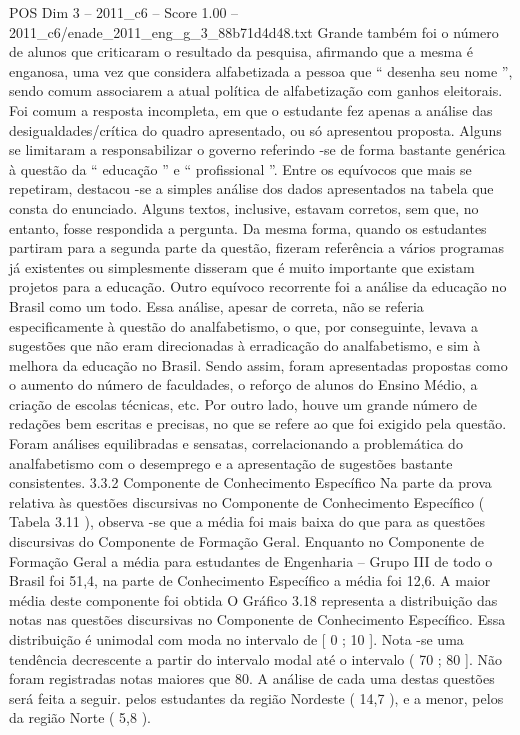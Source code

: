 \begin{textsample}{POS Dim 3 – 2011\_c6 – Score 1.00 – 2011\_c6/enade\_2011\_eng\_g\_3\_88b71d4d48.txt}
Grande também foi o número de alunos que criticaram o resultado da pesquisa, afirmando que a mesma é enganosa, uma vez que considera alfabetizada a pessoa que “ desenha seu nome ”, sendo comum associarem a atual política de alfabetização com ganhos eleitorais.
Foi comum a resposta incompleta, em que o estudante fez apenas a análise das desigualdades/crítica do quadro apresentado, ou só apresentou proposta.
Alguns se limitaram a responsabilizar o governo referindo -se de forma bastante genérica à questão da “ educação ” e “ profissional ”.
Entre os equívocos que mais se repetiram, destacou -se a simples análise dos dados apresentados na tabela que consta do enunciado.
Alguns textos, inclusive, estavam corretos, sem que, no entanto, fosse respondida a pergunta.
Da mesma forma, quando os estudantes partiram para a segunda parte da questão, fizeram referência a vários programas já existentes ou simplesmente disseram que é muito importante que existam projetos para a educação.
Outro equívoco recorrente foi a análise da educação no Brasil como um todo.
Essa análise, apesar de correta, não se referia especificamente à questão do analfabetismo, o que, por conseguinte, levava a sugestões que não eram direcionadas à erradicação do analfabetismo, e sim à melhora da educação no Brasil.
Sendo assim, foram apresentadas propostas como o aumento do número de faculdades, o reforço de alunos do Ensino Médio, a criação de escolas técnicas, etc.
Por outro lado, houve um grande número de redações bem escritas e precisas, no que se refere ao que foi exigido pela questão.
Foram análises equilibradas e sensatas, correlacionando a problemática do analfabetismo com o desemprego e a apresentação de sugestões bastante consistentes. 3.3.2 Componente de Conhecimento Específico Na parte da prova relativa às questões discursivas no Componente de Conhecimento Específico ( Tabela 3.11 ), observa -se que a média foi mais baixa do que para as questões discursivas do Componente de Formação Geral.
Enquanto no Componente de Formação Geral a média para estudantes de Engenharia – Grupo III de todo o Brasil foi 51,4, na parte de Conhecimento Específico a média foi 12,6.
A maior média deste componente foi obtida O Gráfico 3.18 representa a distribuição das notas nas questões discursivas no Componente de Conhecimento Específico.
Essa distribuição é unimodal com moda no intervalo de [ 0 ; 10 ].
Nota -se uma tendência decrescente a partir do intervalo modal até o intervalo ( 70 ; 80 ].
Não foram registradas notas maiores que 80.
A análise de cada uma destas questões será feita a seguir. pelos estudantes da região Nordeste ( 14,7 ), e a menor, pelos da região Norte ( 5,8 ).

\end{textsample}
